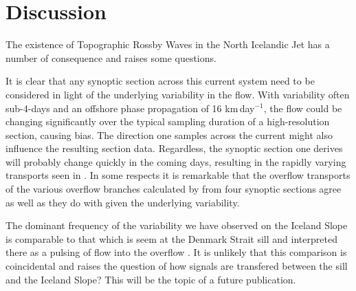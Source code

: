 \documentclass[12pt,titlepage,figuresatend]{article}
\begin{document}


\section{Discussion}

The existence of Topographic Rossby Waves in the North Icelandic Jet has a number of consequence and raises some questions.

It is clear that any synoptic section across this current system need to be considered in light of the underlying variability in the flow. With variability often sub-4-days and an offshore phase propagation of 16 km$\,$day$^{-1}$, the flow could be changing significantly over the typical sampling duration of a high-resolution section, causing bias. The direction one samples across the current might also influence the resulting section data. Regardless, the synoptic section one derives will probably change quickly in the coming days, resulting in the rapidly varying transports seen in \cite{Harden2016}. In some respects it is remarkable that the overflow transports of the various overflow branches calculated by \cite{Vage2013} from four synoptic sections agree as well as they do with \cite{Harden2016} given the underlying variability.

The dominant frequency of the variability we have observed on the Iceland Slope is comparable to that which is seem at the Denmark Strait sill \cite[]{Jochumsen2017} and interpreted there as a pulsing of flow into the overflow \cite[]{Appen2017}. It is unlikely that this comparison is coincidental and raises the question of how signals are transfered between the sill and the Iceland Slope? This will be the topic of a future publication.
\end{document}
